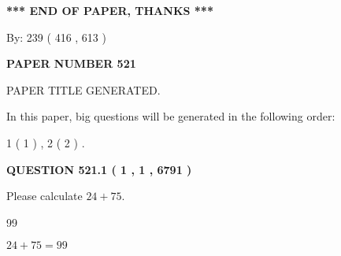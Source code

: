 \documentclass[12pt]{article}
\begin{document}
   
   
   
\vspace{1.0in} 
{\textbf{\large{ *** END OF PAPER, THANKS *** }}} 
   
   
\hspace{1.0in} By: 
 239 ( 416 ,  613 )
   
   
   
   
\newpage 
\setcounter{page}{ 
   521001 } 
   
   
   
   
 {\textbf{ \Large{ PAPER NUMBER  521  }}}
   
   
\vspace{0.2in}
   
   
   
   
   
   
   
   
 \vspace{0.2in}
 
 
 
 
   
   
 PAPER TITLE GENERATED.
   
   
   
\vspace{0.2in}
   
In this paper, big questions will be generated in the following order: 
   
   
   1 ( 1 )
 ,
   2 ( 2 )
 .
  
\vspace{0.2in}
  
{\textbf{\Large{QUESTION
521.1 
 ( 1 , 1 , 6791 )
}}}
  
  
 
Please calculate $ %
24 +  %
75 $.
 
 
 
\noindent{}
 
 

99
 
 
\noindent{}
 
 

 
 
 
\noindent{}
 
 

$ %
24 +  %
75=   %
99$
 
\end{document}
